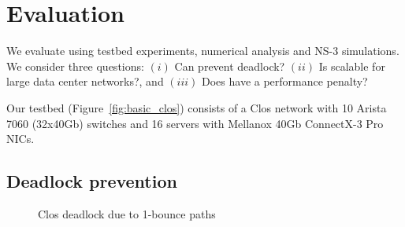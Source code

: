 \section{Evaluation}\label{sec:eval}

We evaluate \sysname{} using testbed experiments, numerical analysis and NS-3 simulations.  We
consider three questions: $(i)$ Can \sysname{} prevent deadlock?  $(ii)$ Is
\sysname{} scalable for large data center networks?, and $(iii)$ Does \sysname{}
have a performance penalty?


 Our testbed (Figure~\ref{fig:basic_clos}) consists of a Clos
network with 10 Arista 7060 (32x40Gb) switches and 16 servers with Mellanox 40Gb
ConnectX-3 Pro NICs.

\subsection{Deadlock prevention}\label{subsec:exp_validation}

\begin{figure}[t]
	\centering
	
	\caption{Clos deadlock due to 1-bounce paths}\label{fig:exp_validation_nonloop}
\end{figure}

